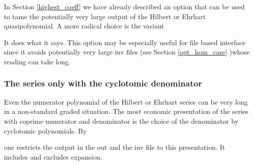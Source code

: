 In Section \ref{highest_coeff} we have already described an option that can be used to tame the potentially very large output of the Hilbert or Ehrhart quasipolynomial.  A more radical choice is the variant
\begin{itemize}
	\itemtt[NoQuasiPolynomial]
\end{itemize}
It does what it says. This option may be especially useful for file based interface since it avoids potentially very large inv files (see Section \ref{opt_hom_case} )whose reading can take long.

\subsubsection{The series only with the cyclotomic denominator}

Even the numerator polynomial of the Hilbert or Ehrhart series can be  very long in a non-standard graded situation. The most economic presentation of the series with coprime numerator and denominator is the choice of the denominator by cyclotomic polynomials. By
\begin{itemize}
	\itemtt[OnlyCyclotomicHilbSer]
\end{itemize}
one restricts the output in the out and the inv file to this presentation. It includes  and excludes expansion.

